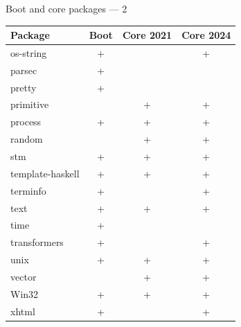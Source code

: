 \documentclass[handout]{beamer}
\begin{document}
\begin{frame}{Boot and core packages --- 2}

\begin{table}[c]
\begin{tabular}{lccc}
Package          & Boot              & Core 2021 & Core 2024          \\
\hline
os-string        & +                 &           & \cellcolor{green}+ \\
parsec           & \cellcolor{red}+  &           &                    \\
pretty           & \cellcolor{red}+  &           &                    \\
primitive        &                   & +         & +                  \\
process          & +                 & +         & +                  \\
random           &                   & +         & +                  \\
stm              & +                 & +         & +                  \\
template-haskell & +                 & +         & +                  \\
terminfo         & +                 &           & \cellcolor{green}+ \\
text             & +                 & +         & +                  \\
time             & \cellcolor{red}+  &           &                    \\
transformers     & +                 &           & \cellcolor{green}+ \\
unix             & +                 & +         & +                  \\
vector           &                   & +         & +                  \\
Win32            & +                 & +         & +                  \\
xhtml            & +                 &           & \cellcolor{green}+ \\
\end{tabular}
\end{table}

\end{frame}
\end{document}
